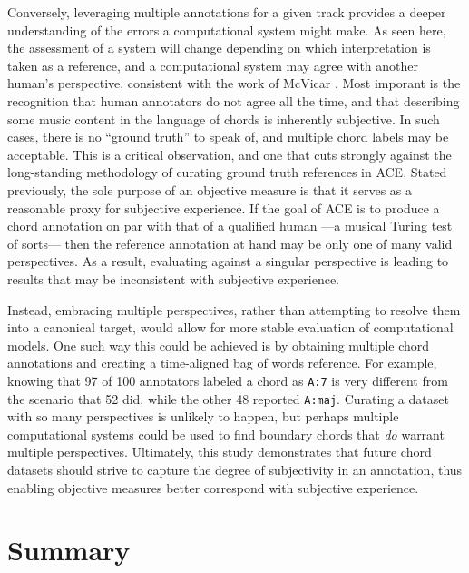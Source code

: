 Conversely, leveraging multiple annotations for a given track provides a deeper understanding of the errors a computational system might make.
As seen here, the assessment of a system will change depending on which interpretation is taken as a reference, and a computational system may agree with another human's perspective, consistent with the work of McVicar \cite{McVicar}.
Most imporant is the recognition that human annotators do not agree all the time, and that describing some music content in the language of chords is inherently subjective.
In such cases, there is no ``ground truth'' to speak of, and multiple chord labels may be acceptable.
This is a critical observation, and one that cuts strongly against the long-standing methodology of curating ground truth references in ACE.
Stated previously, the sole purpose of an objective measure is that it serves as a reasonable proxy for subjective experience.
If the goal of ACE is to produce a chord annotation on par with that of a qualified human ---a musical Turing test of sorts--- then the reference annotation at hand may be only one of many valid perspectives.
As a result, evaluating against a singular perspective is leading to results that may be inconsistent with subjective experience.

Instead, embracing multiple perspectives, rather than attempting to resolve them into a canonical target, would allow for more stable evaluation of computational models.
One such way this could be achieved is by obtaining multiple chord annotations and creating a time-aligned bag of words reference.
For example, knowing that 97 of 100 annotators labeled a chord as \texttt{A:7} is very different from the scenario that 52 did, while the other 48 reported \texttt{A:maj}.
Curating a dataset with so many perspectives is unlikely to happen, but perhaps multiple computational systems could be used to find boundary chords that \emph{do} warrant multiple perspectives.
Ultimately, this study demonstrates that future chord datasets should strive to capture the degree of subjectivity in an annotation, thus enabling objective measures better correspond with subjective experience.


\section{Summary}
\label{sec:summary}

